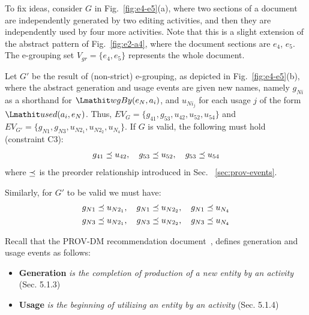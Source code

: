 To fix ideas, consider $G$ in Fig.~\ref{fig:e4-e5}(a), where two sections of a document are independently generated by two editing activities, and then they are independently used by four more activities. Note that this is a slight extension of the abstract pattern of Fig.~\ref{fig:e2-a4}, where the document sections are $e_4$, $e_5$.
%
The e-grouping set $V_{gr} = \{ e_4, e_5\}$ represents the whole document. 

Let $G'$ be the result of (non-strict) e-grouping, as depicted in Fig.~\ref{fig:e4-e5}(b), where the abstract generation and usage events are given new names, namely $g_{Ni}$ as a shorthand for $\wgby(e_N,a_i)$, and $u_{Ni_j}$ for each usage $j$ of the form $\used(a_i, e_N)$. 
Thus, $EV_G = \{ g_{41}, g_{53}, u_{42}, u_{52}, u_{54} \}$ and $EV_{G'} = \{ g_{N1}, g_{N3}, u_{N2_1}, u_{N2_2}, u_{N_4} \}$.
%
If $G$ is valid, the following must hold (constraint C3):
\begin{align}
\label{eq:c3-G}
g_{41} \preceq u_{42}, \quad g_{53} \preceq u_{52}, \quad g_{53} \preceq u_{54} 
\end{align}
where $\preceq$ is the preorder relationship introduced in Sec. ~\ref{sec:prov-events}.

Similarly, for $G'$ to be valid we must have:
\begin{align}
g_{N1} \preceq u_{N2_1}, \quad g_{N1} \preceq u_{N2_2}, \quad g_{N1} \preceq u_{N_4}  \label{eq:c3-global1} \\  
g_{N3} \preceq u_{N2_1}, \quad g_{N3} \preceq u_{N2_2}, \quad g_{N3} \preceq u_{N_4} \label{eq:c3-global2} 
\end{align}

Recall that the PROV-DM recommendation document~\citep{w3c-prov-dm}, defines generation and usage events as follows:
\begin{itemize}
	\item\textbf{Generation} \textit{is the completion of production of a new entity by an activity} (Sec. 5.1.3)
	\item\textbf{Usage} \textit{is the beginning of utilizing an entity by an activity} (Sec. 5.1.4)
\end{itemize}

